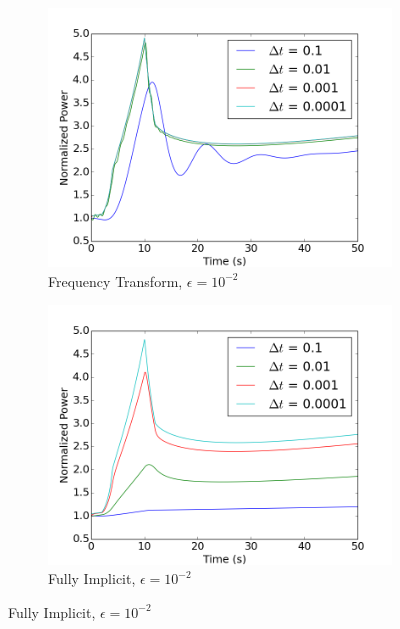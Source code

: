 \documentclass[12pt]{report}
\begin{document}
		\begin{figure}[ht]
			\centering
			\begin{subfigure}{.5\textwidth}
				\centering
				\includegraphics[width=.95\linewidth]{figs/power_case1_conv1.png}
				\caption{Frequency Transform, $\epsilon = 10^{-2}$}
				\label{fig::power_1_1_ft}
			\end{subfigure}%
			\begin{subfigure}{.5\textwidth}
				\centering
				\includegraphics[width=.95\linewidth]{figs/power_case1_conv1_omega0.png}
				\caption{Fully Implicit, $\epsilon = 10^{-2}$}
				\label{fig::power_1_1_fi}
			\end{subfigure}


\end{figure}
\end{document}
